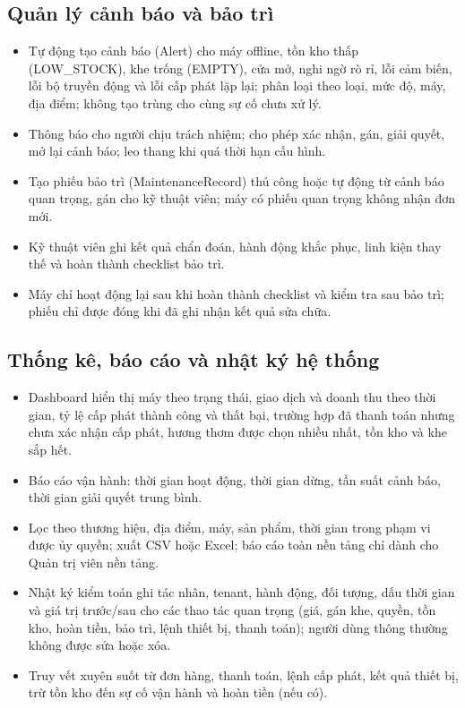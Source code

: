 \subsection{Quản lý cảnh báo và bảo trì}
\begin{itemize}
  \item Tự động tạo cảnh báo (Alert) cho máy offline, tồn kho thấp (LOW\_STOCK), khe trống (EMPTY), cửa mở, nghi ngờ rò rỉ, lỗi cảm biến, lỗi bộ truyền động và lỗi cấp phát lặp lại; phân loại theo loại, mức độ, máy, địa điểm; không tạo trùng cho cùng sự cố chưa xử lý.
  \item Thông báo cho người chịu trách nhiệm; cho phép xác nhận, gán, giải quyết, mở lại cảnh báo; leo thang khi quá thời hạn cấu hình.
  \item Tạo phiếu bảo trì (MaintenanceRecord) thủ công hoặc tự động từ cảnh báo quan trọng, gán cho kỹ thuật viên; máy có phiếu quan trọng không nhận đơn mới.
  \item Kỹ thuật viên ghi kết quả chẩn đoán, hành động khắc phục, linh kiện thay thế và hoàn thành checklist bảo trì.
  \item Máy chỉ hoạt động lại sau khi hoàn thành checklist và kiểm tra sau bảo trì; phiếu chỉ được đóng khi đã ghi nhận kết quả sửa chữa.
\end{itemize}
\subsection{Thống kê, báo cáo và nhật ký hệ thống}
\begin{itemize}
  \item Dashboard hiển thị máy theo trạng thái, giao dịch và doanh thu theo thời gian, tỷ lệ cấp phát thành công và thất bại, trường hợp đã thanh toán nhưng chưa xác nhận cấp phát, hương thơm được chọn nhiều nhất, tồn kho và khe sắp hết.
  \item Báo cáo vận hành: thời gian hoạt động, thời gian dừng, tần suất cảnh báo, thời gian giải quyết trung bình.
  \item Lọc theo thương hiệu, địa điểm, máy, sản phẩm, thời gian trong phạm vi được ủy quyền; xuất CSV hoặc Excel; báo cáo toàn nền tảng chỉ dành cho Quản trị viên nền tảng.
  \item Nhật ký kiểm toán ghi tác nhân, tenant, hành động, đối tượng, dấu thời gian và giá trị trước/sau cho các thao tác quan trọng (giá, gán khe, quyền, tồn kho, hoàn tiền, bảo trì, lệnh thiết bị, thanh toán); người dùng thông thường không được sửa hoặc xóa.
  \item Truy vết xuyên suốt từ đơn hàng, thanh toán, lệnh cấp phát, kết quả thiết bị, trừ tồn kho đến sự cố vận hành và hoàn tiền (nếu có).
\end{itemize}

